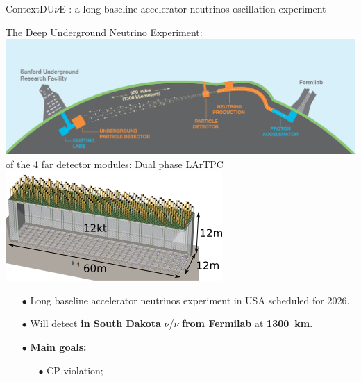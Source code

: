 \documentclass[10pt]{beamer}
\begin{document}
    \begin{frame}{Context}{DU$\nu$E : a long baseline accelerator neutrinos oscillation experiment}
    	\begin{scriptsize}
    	\begin{minipage}{0.58\textwidth}
    		\centering
    		The Deep Underground Neutrino Experiment:\\
    		\includegraphics[width=\textwidth]{figures/contexte/dune.jpg}\\
    		\vspace{0.5cm}
    		 of the 4 far detector modules: Dual phase LArTPC\\
    		\includegraphics[width=\textwidth]{figures/contexte/dune_module.png}\\
    	\end{minipage}
    	\hfill
    	\begin{minipage}{0.38\textwidth}
    		\begin{itemize}
    			\item[$\bullet$] Long baseline accelerator neutrinos experiment in USA scheduled for 2026.
    			\item[$\bullet$] Will detect \textbf{in South Dakota} $\nu$/$\overline{\nu}$ \textbf{from Fermilab} at \textbf{\SI{1300}{\kilo\meter}}.
    			\item[$\bullet$] \textbf{Main goals: }
	    			\begin{itemize}
	    				\item[$\bullet$] CP violation;

\end{itemize}
\end{itemize}
\end{minipage}
\end{scriptsize}
\end{frame}
\end{document}
